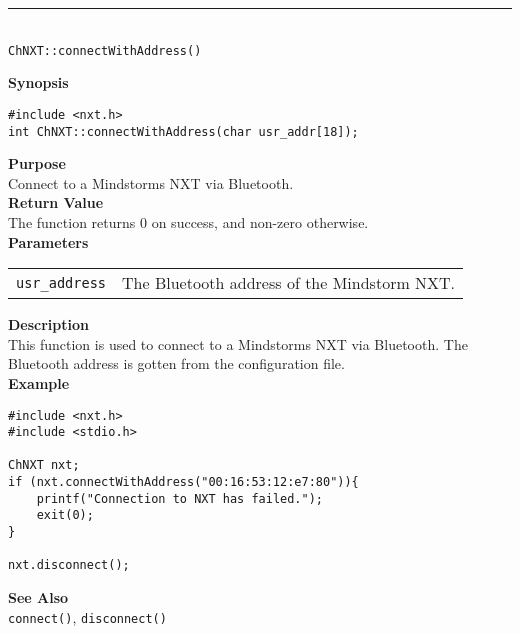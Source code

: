 \noindent
\vspace{5pt}
\rule{4.5in}{0.015in}\\
\noindent
{\LARGE \texttt{ChNXT::connectWithAddress()} }\\


\noindent
{\bf Synopsis}
\vspace{-8pt}
\begin{verbatim}
#include <nxt.h>
int ChNXT::connectWithAddress(char usr_addr[18]);
\end{verbatim}

\noindent
{\bf Purpose}\\
Connect to a Mindstorms NXT via Bluetooth.\\

\noindent
{\bf Return Value}\\
The function returns 0 on success, and non-zero otherwise.\\

\noindent
{\bf Parameters}\\
\vspace{-0.1in}
\begin{description}
\item
\begin{tabular}{p{20mm}p{135mm}}
\texttt{usr\_address} & The Bluetooth address of the Mindstorm NXT.
\end{tabular}
\end{description}

\noindent
{\bf Description}\\
This function is used to connect to a Mindstorms NXT via Bluetooth. The Bluetooth address is gotten from the configuration file.\\

\noindent
{\bf Example}
\begin{verbatim}
#include <nxt.h> 
#include <stdio.h>

ChNXT nxt;
if (nxt.connectWithAddress("00:16:53:12:e7:80")){
    printf("Connection to NXT has failed.");
    exit(0);
}
    
nxt.disconnect();
\end{verbatim}

\noindent
{\bf See Also}\\
\texttt{connect()}, \texttt{disconnect()}\\
